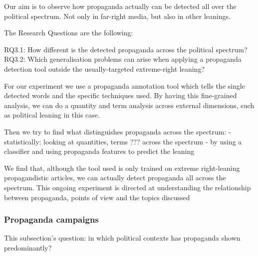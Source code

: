 Our aim is to observe how propaganda actually can be detected all over the political spectrum. Not only in far-right media, but also in other leanings.

The Research Questions are the following:


RQ3.1: How different is the detected propaganda across the political spectrum?
RQ3.2: Which generalisation problems can arise when applying a propaganda detection tool outside the usually-targeted extreme-right leaning?



For our experiment we use a propaganda annotation tool which tells the single detected words and the specific techniques used. By having this fine-grained analysis, we can do a quantity and term analysis across external dimensions, such as political leaning in this case.

Then we try to find what distinguishes propaganda across the spectrum:
- statistically: looking at quantities, terms ??? across the spectrum
- by using a classifier and using propaganda features to predict the leaning


We find that, although the tool used is only trained on extreme right-leaning propagandistic
articles, we can actually detect propaganda all across the spectrum. This ongoing experiment is directed at understanding the relationship between propaganda, points of view and the topics discussed




\subsubsection{Propaganda campaigns}
This subsection’s question: in which political contexts has propaganda shown predominantly? 


